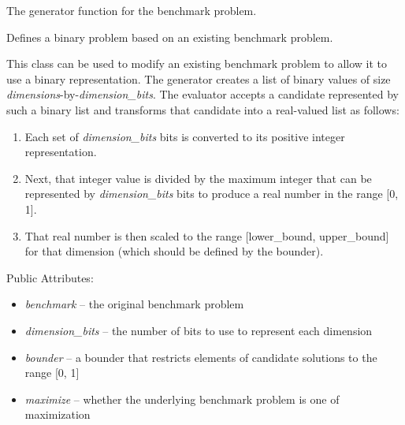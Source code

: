 \documentclass[letterpaper,10pt,english]{sphinxmanual}
\begin{document}
\begin{fulllineitems}
\begin{fulllineitems}
\end{fulllineitems}


\begin{fulllineitems}
\label{reference:inspyred.benchmarks.Benchmark.generator}
The generator function for the benchmark problem.

\end{fulllineitems}


\end{fulllineitems}


\begin{fulllineitems}
\label{reference:inspyred.benchmarks.Binary}
Defines a binary problem based on an existing benchmark problem.

This class can be used to modify an existing benchmark problem to
allow it to use a binary representation. The generator creates
a list of binary values of size \emph{dimensions}-by-\emph{dimension\_bits}.
The evaluator accepts a candidate represented by such a binary list
and transforms that candidate into a real-valued list as follows:
\begin{enumerate}
\item {} 
Each set of \emph{dimension\_bits} bits is converted to its positive
integer representation.

\item {} 
Next, that integer value is divided by the maximum integer that 
can be represented by \emph{dimension\_bits} bits to produce a real 
number in the range {[}0, 1{]}.

\item {} 
That real number is then scaled to the range {[}lower\_bound, 
upper\_bound{]} for that dimension (which should be defined by 
the bounder).

\end{enumerate}

Public Attributes:
\begin{itemize}
\item {} 
\emph{benchmark} -- the original benchmark problem

\item {} 
\emph{dimension\_bits} -- the number of bits to use to represent each dimension

\item {} 
\emph{bounder} -- a bounder that restricts elements of candidate solutions to 
the range {[}0, 1{]}

\item {} 
\emph{maximize} -- whether the underlying benchmark problem is one of maximization

\end{itemize}

\end{fulllineitems}
\end{document}
